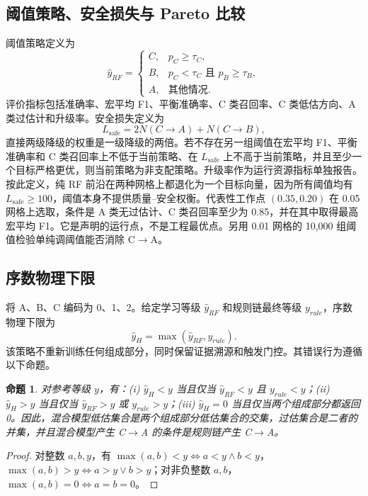 \documentclass[10pt,twocolumn,a4paper]{ctexart}
\newcommand{\CtoA}{C$\rightarrow$A}
\newcommand{\Lsafe}{L_{\mathrm{safe}}}
\newtheorem{proposition}{命题}
\begin{document}
\subsection{阈值策略、安全损失与 Pareto 比较}
阈值策略定义为
\begin{equation}
\hat y_{RF}=\begin{cases}C,&p_C\geq\tau_C,\\B,&p_C<\tau_C\text{ 且 }p_B\geq\tau_B,\\A,&\text{其他情况}.
\end{cases}
\label{eq:threshold}
\end{equation}
评价指标包括准确率、宏平均 F1、平衡准确率、C 类召回率、C 类低估方向、A 类过估计和升级率。安全损失定义为
\begin{equation}
\Lsafe=2N(C\rightarrow A)+N(C\rightarrow B),
\label{eq:safeloss}
\end{equation}
直接两级降级的权重是一级降级的两倍。若不存在另一组阈值在宏平均 F1、平衡准确率和 C 类召回率上不低于当前策略、在 $\Lsafe$ 上不高于当前策略，并且至少一个目标严格更优，则当前策略为非支配策略。升级率作为运行资源指标单独报告。按此定义，纯 RF 前沿在两种网格上都退化为一个目标向量，因为所有阈值均有 $\Lsafe\geq100$，阈值本身不提供质量–安全权衡。代表性工作点 $(0.35,0.20)$ 在 0.05 网格上选取，条件是 A 类无过估计、C 类召回率至少为 0.85，并在其中取得最高宏平均 F1。它是声明的运行点，不是工程最优点。另用 0.01 网格的 10,000 组阈值检验单纯调阈值能否消除 \CtoA{}。

\subsection{序数物理下限}
将 A、B、C 编码为 0、1、2。给定学习等级 $\hat y_{RF}$ 和规则链最终等级 $y_{rule}$，序数物理下限为
\begin{equation}
\hat y_H=\max(\hat y_{RF},y_{rule}).
\label{eq:veto}
\end{equation}
该策略不重新训练任何组成部分，同时保留证据溯源和触发门控。其错误行为遵循以下命题。
\begin{proposition}
对参考等级 $y$，有：(i) $\hat y_H<y$ 当且仅当 $\hat y_{RF}<y$ 且 $y_{rule}<y$；(ii) $\hat y_H>y$ 当且仅当 $\hat y_{RF}>y$ 或 $y_{rule}>y$；(iii) $\hat y_H=0$ 当且仅当两个组成部分都返回 0。因此，混合模型低估集合是两个组成部分低估集合的交集，过估集合是二者的并集，并且混合模型产生 \CtoA{} 的条件是规则链产生 \CtoA{}。
\end{proposition}
\begin{proof}
对整数 $a,b,y$，有 $\max(a,b)<y\Leftrightarrow a<y\wedge b<y$，$\max(a,b)>y\Leftrightarrow a>y\vee b>y$；对非负整数 $a,b$，$\max(a,b)=0\Leftrightarrow a=b=0$。
\end{proof}
\end{document}
